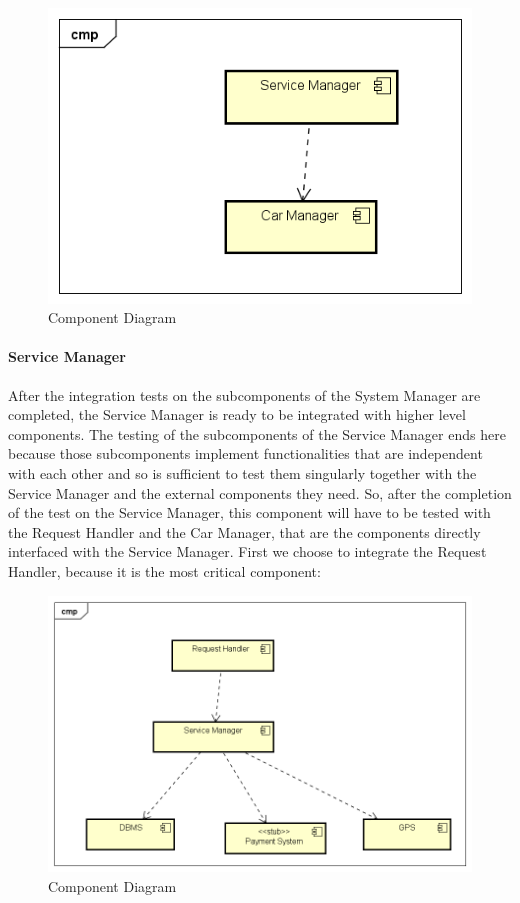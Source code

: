\begin{figure}[H]	
	\centering
	\includegraphics[width=\textwidth]{img/CarMan_SrvMan_int}
	\caption{Component Diagram}
\end{figure}

\paragraph{Service Manager}
After the integration tests on the subcomponents of the System Manager are completed, the Service Manager is ready to be integrated with higher level components. The testing of the subcomponents of the Service Manager ends here because those subcomponents implement functionalities that are independent with each other and so is sufficient to test them singularly together with the Service Manager and the external components they need.
\newline
So, after the completion of the test on the Service Manager, this component will have to be tested with the Request Handler and the Car Manager, that are the components directly interfaced with the Service Manager.
First we choose to integrate the Request Handler, because it is the most critical component:


\begin{figure}[H]	
	\centering
	\includegraphics[width=\textwidth]{img/SrvMan_ReqHan_int}
	\caption{Component Diagram}
\end{figure}

